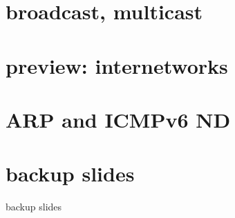 \section{broadcast, multicast}

\section{preview: internetworks}

\section{ARP and ICMPv6 ND}

\section{backup slides}
\begin{frame}{backup slides}
\end{frame}


